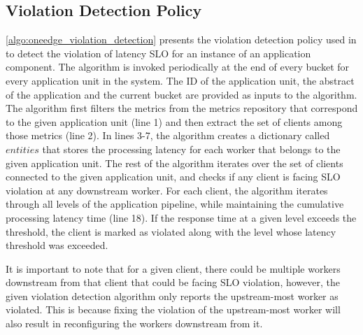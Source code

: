\subsection{Violation Detection Policy}
\cref{algo:oneedge_violation_detection} presents the violation detection policy used in \oneedge{} to detect the violation of latency SLO for an instance of an application component. The algorithm is invoked periodically at the end of every bucket for every application unit in the system. The ID of the application unit, the abstract of the application and the current bucket are provided as inputs to the algorithm. The algorithm first filters the metrics from the metrics repository that correspond to the given application unit (line 1) and then extract the set of clients among those metrics (line 2). In lines 3-7, the algorithm creates a dictionary called $entities$ that stores the processing latency for each worker that belongs to the given application unit. The rest of the algorithm iterates over the set of clients connected to the given application unit, and checks if any client is facing SLO violation at any downstream worker. For each client, the algorithm iterates through all levels of the application pipeline, while maintaining the cumulative processing latency time (line 18). If the response time at a given level exceeds the threshold, the client is marked as violated along with the level whose latency threshold was exceeded.
\par It is important to note that for a given client, there could be multiple workers downstream from that client that could be facing SLO violation, however, the given violation detection algorithm only reports the upstream-most worker as violated. This is because fixing the violation of the upstream-most worker will also result in reconfiguring the workers downstream from it.
